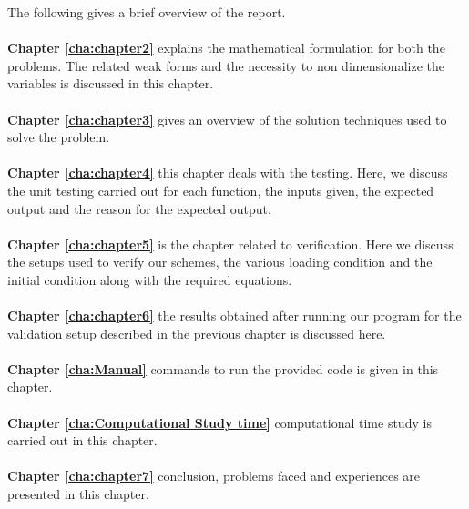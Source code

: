 \noindent The following gives a brief overview of the report. 
\\
\\
\textbf{Chapter \ref{cha:chapter2}} explains the mathematical formulation for both the problems. The related weak forms and the necessity to non dimensionalize the variables is discussed in this chapter.
\\
\\
\textbf{Chapter \ref{cha:chapter3}} gives an overview of the solution techniques used to solve the problem.
\\
\\
\textbf{Chapter \ref{cha:chapter4}} this chapter deals with the testing. Here, we discuss the unit testing carried out for each function, the inputs given, the expected output and the reason for the expected output.
\\
\\
\textbf{Chapter \ref{cha:chapter5}} is the chapter related to verification. Here we discuss the setups used to verify our schemes, the various loading condition and the initial condition along with the required equations.
\\
\\
\textbf{Chapter \ref{cha:chapter6}} the results obtained after running our program for the validation setup described in the previous chapter is discussed here.
\\
\\
\textbf{Chapter \ref{cha:Manual}} commands to run the provided code is given in this chapter.
\\
\\
\textbf{Chapter \ref{cha:Computational Study time}} computational time study is carried out in this chapter.
\\
\\
\textbf{Chapter \ref{cha:chapter7}} conclusion, problems faced and experiences are presented in this chapter.